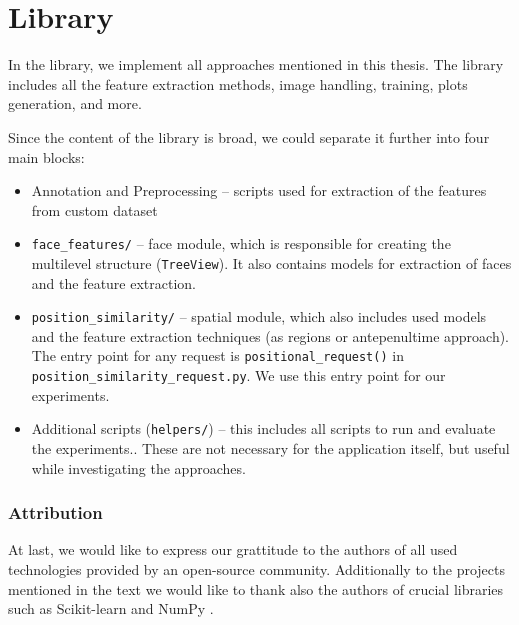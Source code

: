 \section{Library}

In the library, we implement all approaches mentioned in this thesis. The library includes all the feature extraction methods, image handling, training, plots generation, and more.

Since the content of the library is broad, we could separate it further into four main blocks: 
\begin{itemize}
    \item Annotation and Preprocessing -- scripts used for extraction of the features from custom dataset
    \item \verb+face_features/+ -- face module, which is responsible for creating the multilevel structure (\verb+TreeView+). It also contains models for extraction of faces and the feature extraction.
    \item \verb+position_similarity/+ -- spatial module, which also includes used models and the feature extraction techniques (as regions or antepenultime approach). The entry point for any request is \verb+positional_request()+ in \verb+position_similarity_request.py+. We use this entry point for our experiments.
    \item Additional scripts (\verb+helpers/+) -- this includes all scripts to run and evaluate the experiments.. These are not necessary for the application itself, but useful while investigating the approaches.
\end{itemize}

\subsubsection*{Attribution}

At last, we would like to express our grattitude to the authors of all used technologies provided by an open-source community. Additionally to the projects mentioned in the text we would like to thank also the authors of crucial libraries such as Scikit-learn \citep{pedregosa2011scikit} and NumPy \citep{van2011numpy}.

